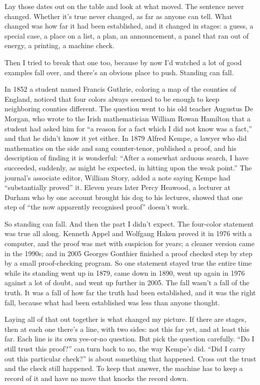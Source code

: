 \documentclass[11pt,twoside]{article}
\theoremstyle{thielethm}
\theoremstyle{thieledef}
\theoremstyle{thieledef}
\theoremstyle{thieledef}
\theoremstyle{thielethm}
\theoremstyle{thieleobs}
\theoremstyle{thielethm}
\begin{document}
Lay those dates out on the table and look at what moved. The sentence never changed. Whether it's true never changed, as far as anyone can tell. What changed was how far it had been established, and it changed in stages: a guess, a special case, a place on a list, a plan, an announcement, a panel that ran out of energy, a printing, a machine check.

Then I tried to break that one too, because by now I'd watched a lot of good examples fall over, and there's an obvious place to push. Standing can fall.

In 1852 a student named Francis Guthrie, coloring a map of the counties of England, noticed that four colors always seemed to be enough to keep neighboring counties different. The question went to his old teacher Augustus De Morgan, who wrote to the Irish mathematician William Rowan Hamilton that a student had asked him for ``a reason for a fact which I did not know was a fact,'' and that he didn't know it yet either. In 1879 Alfred Kempe, a lawyer who did mathematics on the side and sang counter-tenor, published a proof, and his description of finding it is wonderful: ``After a somewhat arduous search, I have succeeded, suddenly, as might be expected, in hitting upon the weak point.'' The journal's associate editor, William Story, added a note saying Kempe had ``substantially proved'' it. Eleven years later Percy Heawood, a lecturer at Durham who by one account brought his dog to his lectures, showed that one step of ``the now apparently recognised proof'' doesn't work.

So standing can fall. And then the part I didn't expect. The four-color statement was true all along. Kenneth Appel and Wolfgang Haken proved it in 1976 with a computer, and the proof was met with suspicion for years; a cleaner version came in the 1990s; and in 2005 Georges Gonthier finished a proof checked step by step by a small proof-checking program. So one statement stayed true the entire time while its standing went up in 1879, came down in 1890, went up again in 1976 against a lot of doubt, and went up further in 2005. The fall wasn't a fall of the truth. It was a fall of how far the truth had been established, and it was the right fall, because what had been established was less than anyone thought.

Laying all of that out together is what changed my picture. If there are stages, then at each one there's a line, with two sides: not this far yet, and at least this far. Each line is its own yes-or-no question. But pick the question carefully. ``Do I still trust this proof?'' can turn back to no, the way Kempe's did. ``Did I carry out this particular check?'' is about something that happened. Cross out the trust and the check still happened. To keep that answer, the machine has to keep a record of it and have no move that knocks the record down.
\end{document}
